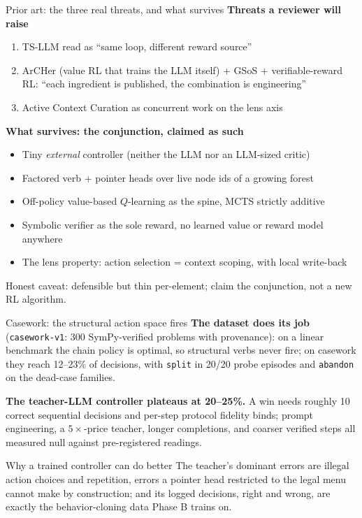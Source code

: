 \documentclass[aspectratio=169]{beamer}
\newcommand{\verbword}[1]{\texttt{#1}}
\begin{document}
\begin{frame}{Prior art: the three real threats, and what survives}
  \textbf{Threats a reviewer will raise}
  \begin{enumerate}
    \item TS-LLM read as ``same loop, different reward source''
    \item ArCHer (value RL that trains the LLM itself) + GSoS +
          verifiable-reward RL: ``each ingredient is published, the
          combination is engineering''
    \item Active Context Curation as concurrent work on the lens axis
  \end{enumerate}
  \smallskip
  \textbf{What survives: the conjunction, claimed as such}
  \begin{itemize}
    \item Tiny \emph{external} controller (neither the LLM nor an LLM-sized critic)
    \item Factored verb + pointer heads over live node ids of a growing forest
    \item Off-policy value-based $Q$-learning as the spine, MCTS strictly additive
    \item Symbolic verifier as the sole reward, no learned value or reward
          model anywhere
    \item The lens property: action selection = context scoping, with local write-back
  \end{itemize}
  \smallskip
  \footnotesize Honest caveat: defensible but thin per-element; claim the
  conjunction, not a new RL algorithm.
\end{frame}

\begin{frame}{Casework: the structural action space fires}
  \textbf{The dataset does its job} (\texttt{casework-v1}: 300
  SymPy-verified problems with provenance): on a linear benchmark the
  chain policy is optimal, so structural verbs never fire; on casework
  they reach \alert{12--23\%} of decisions, with \verbword{split} in
  20/20 probe episodes and \verbword{abandon} on the dead-case families.
  \medskip

  \textbf{The teacher-LLM controller plateaus at 20--25\%.} A win needs
  roughly 10 correct sequential decisions and per-step protocol fidelity
  binds; prompt engineering, a $5\times$-price teacher, longer
  completions, and coarser verified steps all measured null against
  pre-registered readings.
  \begin{block}{Why a trained controller can do better}
    The teacher's dominant errors are illegal action choices and
    repetition, errors a pointer head restricted to the legal menu cannot
    make by construction; and its logged decisions, right and wrong, are
    exactly the behavior-cloning data Phase B trains on.
  \end{block}
\end{frame}
\end{document}
